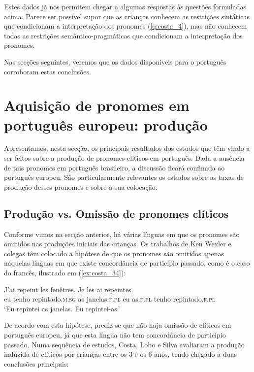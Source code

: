 \documentclass[output=paper]{LSP/langsci}
\begin{document}
Estes dados já nos permitem chegar a algumas respostas às questões formuladas acima. Parece ser possível supor que as crianças conhecem as restrições sintáticas que condicionam a interpretação dos pronomes (\ref{q:costa_4}), mas não conhecem todas as restrições se\-mân\-ti\-co-prag\-má\-ti\-cas que condicionam a interpretação dos pronomes.

Nas secções seguintes, veremos que os dados disponíveis para o português corroboram estas conclusões.


\section{Aquisição de pronomes em português europeu: produção}
\label{sec:costa_aquisicao_pe}

Apresentamos, nesta secção, os principais resultados dos estudos que têm vindo a ser feitos sobre a produção de pronomes clíticos em português. Dada a ausência de tais pronomes em português brasileiro, a discussão ficará confinada ao português europeu. São particularmente relevantes os estudos sobre as taxas de produção desses pronomes e sobre a sua colocação.

\subsection{Produção vs. Omissão de pronomes clíticos}
\label{subsec:costa_producao_omissao}

Conforme vimos na secção anterior, há várias línguas em que os pronomes são omitidos nas produções iniciais das crianças. Os trabalhos de Ken Wexler e colegas têm colocado a hipótese de que os pronomes são omitidos apenas naquelas línguas em que existe concordância de particípio passado, como é o caso do francês, ilustrado em (\ref{ex:costa_34}):

\ea\label{ex:costa_34}
\gll J'ai repeint les fenêtres. Je les ai repeintes.\\
{eu tenho} repintado.\textsc{m.sg} as janelas.\textsc{f.pl} eu as.\textsc{f.pl} tenho repintado.\textsc{f.pl}\\
\glt `Eu repintei as janelas. Eu repintei-as.'
\z

De acordo com esta hipótese, prediz-se que não haja omissão de clíticos em português europeu, já que esta língua não tem concordância de particípio passado. Numa sequência de estudos, Costa, Lobo e Silva \citep{costalobo2007,costalobo_etal2012,silva2008} avaliaram a produção induzida de clíticos por crianças entre os 3 e os 6 anos, tendo chegado a duas conclusões principais:
\end{document}
